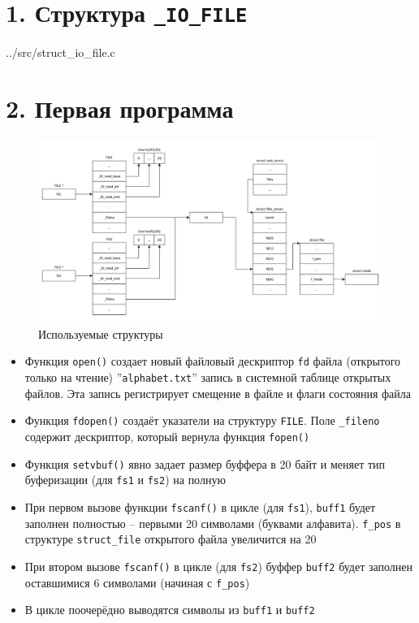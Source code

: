 \section*{1. Структура \texttt{\_IO\_FILE}}

\begin{lstinputlisting}[
	caption={Структура \texttt{\_IO\_FILE}},
	style={c},
	]{../src/struct_io_file.c}
\end{lstinputlisting}

\clearpage

\section*{2. Первая программа}

\begin{figure}[h!btp]
	\centering
	\includegraphics[width=490pt]{inc/scheme1.pdf}
	\caption{Используемые структуры}
	\label{fig:scheme1}	
\end{figure}

\begin{itemize}
	\item Функция \texttt{open()} создает новый файловый дескриптор \texttt{fd} файла (открытого только на чтение) ''\texttt{alphabet.txt}'' запись в системной таблице открытых файлов. Эта запись регистрирует смещение в файле и флаги состояния файла

	\item Функция \texttt{fdopen()} создаёт указатели на структуру \texttt{FILE}. Поле \texttt{\_fileno} содержит дескриптор, который вернула функция \texttt{fopen()}

	\item Функция \texttt{setvbuf()} явно задает размер буффера в 20 байт и меняет тип буферизации	(для \texttt{fs1} и \texttt{fs2}) на полную

	\item При первом вызове функции \texttt{fscanf()} в цикле (для \texttt{fs1}), \texttt{buff1} будет заполнен полностью -- первыми 20 символами (буквами алфавита). \texttt{f\_pos} в структуре \texttt{struct\_file} открытого файла увеличится на 20

	\item При втором вызове \texttt{fscanf()} в цикле (для \texttt{fs2}) буффер \texttt{buff2} будет заполнен оставшимися 6 символами (начиная с \texttt{f\_pos})

	\item В цикле поочерёдно выводятся символы из \texttt{buff1} и \texttt{buff2}
\end{itemize}

